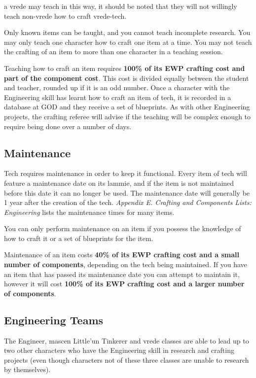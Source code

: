 a vrede may teach in this way, it should be noted that they will not willingly teach non-vrede how to craft vrede-tech.

Only known items can be taught, and you cannot teach incomplete research. You may only teach one character how to craft one item at a time. You may not teach the crafting of an item to more than one character in a teaching session.

Teaching how to craft an item requires \textbf{100\% of its EWP crafting cost and part of the component cost}. This cost is divided equally between the student and teacher, rounded up if it is an odd number. Once a character with the Engineering skill has learnt how to craft an item of tech, it is recorded in a database at GOD and they receive a set of blueprints. As with other Engineering projects, the crafting referee will advise if the teaching will be complex enough to require being done over a number of days.

    \subsection{Maintenance}

Tech requires maintenance in order to keep it functional. Every item of tech will feature a maintenance date on its lammie, and if the item is not maintained before this date it can no longer be used. The maintenance date will generally be 1 year after the creation of the tech. \textit{Appendix E. Crafting and Components Lists:} \textit{Engineering} lists the maintenance times for many items.

You can only perform maintenance on an item if you possess the knowledge of how to craft it or a set of blueprints for the item.

Maintenance of an item costs \textbf{40\% of its EWP crafting cost and a small number of components}, depending on the tech being maintained. If you have an item that has passed its maintenance date you can attempt to maintain it, however it will cost \textbf{100\% of its EWP crafting cost and a larger number of components}.

    \subsection{Engineering Teams}

The Engineer, mascen Little'un Tinkerer and vrede classes are able to lead up to two other characters who have the Engineering skill in research and crafting projects (even though characters not of these three classes are unable to research by themselves).

